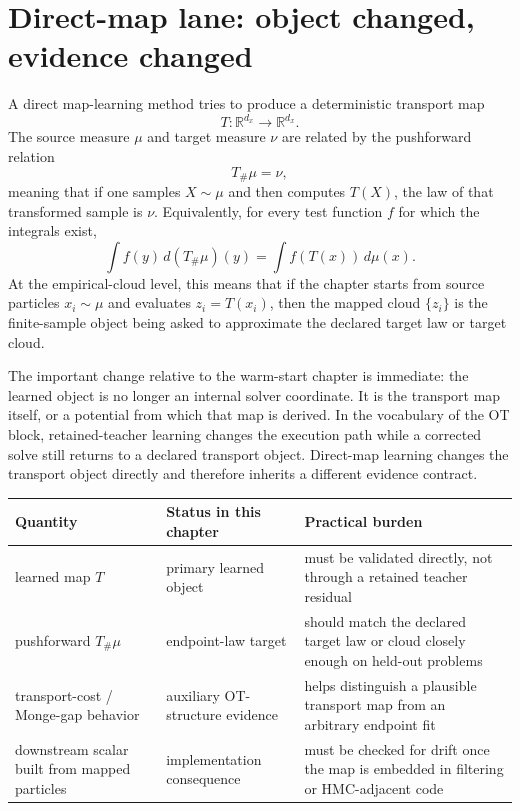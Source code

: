\section{Direct-map lane: object changed, evidence changed}
\label{sec:bf-neural-ot-direct-object}

A direct map-learning method tries to produce a deterministic transport map
\begin{equation}
\label{eq:bf-neural-ot-direct-map-object}
  T:
  \mathbb R^{d_x}\to\mathbb R^{d_x}.
\end{equation}
The source measure \(\mu\) and target measure \(\nu\) are related by the
pushforward relation
\begin{equation}
\label{eq:bf-neural-ot-direct-pushforward}
  T_\#\mu = \nu,
\end{equation}
meaning that if one samples \(X\sim\mu\) and then computes \(T(X)\), the law of
that transformed sample is \(\nu\).  Equivalently, for every test function
\(f\) for which the integrals exist,
\begin{equation}
\label{eq:bf-neural-ot-direct-pushforward-testfn}
  \int f(y)\,d(T_\#\mu)(y)
  =
  \int f(T(x))\,d\mu(x).
\end{equation}
At the empirical-cloud level, this means that if the chapter starts from source
particles \(x_i\sim\mu\) and evaluates \(z_i=T(x_i)\), then the mapped cloud
\(\{z_i\}\) is the finite-sample object being asked to approximate the declared
target law or target cloud.

The important change relative to the warm-start chapter is immediate: the learned
object is no longer an internal solver coordinate.  It is the transport map
itself, or a potential from which that map is derived.  In the vocabulary of the
OT block, retained-teacher learning changes the execution path while a corrected
solve still returns to a declared transport object.  Direct-map learning changes
the transport object directly and therefore inherits a different evidence
contract.

\begin{center}
\small
\begin{tabular}{p{} p{} p{}}
\toprule
Quantity & Status in this chapter & Practical burden \\
\midrule
learned map \(T\) & primary learned object & must be validated directly, not through a retained teacher residual \\
pushforward \(T_\#\mu\) & endpoint-law target & should match the declared target law or cloud closely enough on held-out problems \\
transport-cost / Monge-gap behavior & auxiliary OT-structure evidence & helps distinguish a plausible transport map from an arbitrary endpoint fit \\
downstream scalar built from mapped particles & implementation consequence & must be checked for drift once the map is embedded in filtering or HMC-adjacent code \\
\bottomrule
\end{tabular}
\end{center}

